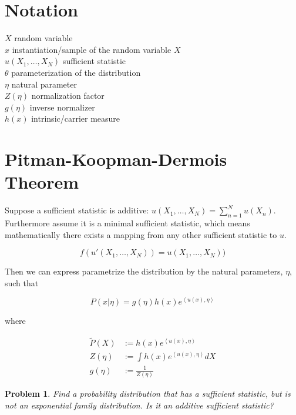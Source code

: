\documentclass[a4paper]{article}
\newtheorem{problem}{Problem}[section]
\begin{document}
\section{Notation}


$X$ random variable \\ 
$x$ instantiation/sample of the random variable $X$ \\
$u(X_1, \ldots, X_N)$ sufficient statistic \\
$\theta$ parameterization of the distribution \\
$\eta$ natural parameter \\
$Z(\eta)$ normalization factor \\
$g(\eta)$ inverse normalizer \\
$h(x)$ intrinsic/carrier measure

\section{Pitman-Koopman-Dermois Theorem}

Suppose a sufficient statistic is additive: $ u(X_1,\ldots,X_N) = \sum_{n=1}^N u(X_n) $.  Furthermore assume it is a minimal sufficient statistic, which means mathematically there exists a mapping from any other sufficient statistic to $u$.

\begin{equation}
  f( u'(X_1,\ldots,X_N) ) = u(X_1,\ldots,X_N) )
  \label{}
\end{equation}

Then we can express parametrize the distribution by the natural parameters, $\eta$, such that

\begin{equation}
  P( x \vert \eta) = g(\eta) h(x) e^{ \left< u(x), \eta \right>}
  \label{}
\end{equation} 

where 

\begin{equation}
  \begin{split}
    \tilde{P}(X) &:= h(x) e^{ \left< u(x), \eta \right> } \\
    Z(\eta) &:= \int h(x) e^{ \left< u(x), \eta \right> } dX \\
    g(\eta) &:= \frac{1}{Z(\eta)}
  \end{split}
  \label{}
\end{equation}

\begin{problem} 
Find a probability distribution that has a sufficient statistic, but is not an exponential family distribution.  Is it an additive sufficient statistic?
\end{problem}
\end{document}
